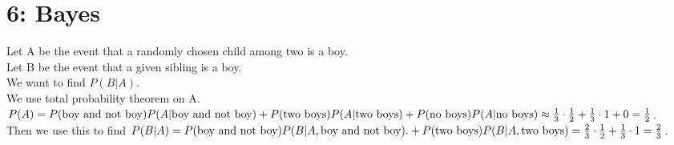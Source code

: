 \documentclass{article}
\begin{document}
\section*{6: Bayes}
Let A be the event that a randomly chosen child among two is a boy.
\\Let B be the event that a given sibling is a boy.
\\We want to find $P(B|A)$.
\\We use total probability theorem on A.
\\$P(A)
= P(\text{boy and not boy})
  P(A|\text{boy and not boy})
\\+ P(\text{two boys})
  P(A|\text{two boys})
\\+ P(\text{no boys})
  P(A|\text{no boys})
\\\approx \frac{1}{3} \cdot \frac{1}{2}
        + \frac{1}{3} \cdot 1
        + 0
= \frac{1}{2}$.
\\Then we use this to find $P(B|A)
\\= P(\text{boy and not boy})P(B|A, \text{boy and not boy}).
  + P(\text{two boys})P(B|A, \text{two boys})
\\= \frac{2}{3} \cdot \frac{1}{2}
  + \frac{1}{3} \cdot 1
\\= \frac{2}{3}$.
\end{document}
